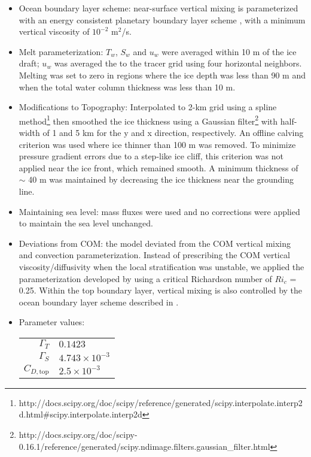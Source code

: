 \documentclass[11pt]{article} %
\begin{document}
\begin{itemize}
\item Ocean boundary layer scheme: near-surface vertical mixing is parameterized with an energy consistent planetary boundary layer scheme \citep{Reichl2018}, with a minimum vertical viscosity of $10^{-2}$ m$^2$/s.

\item Melt parameterization: $T_w$, $S_w$ and $u_w$ were averaged within 10 m of the ice draft; $u_w$ was averaged the to the tracer grid using four horizontal neighbors. Melting was set to zero in regions where the ice depth was less than 90 m and when the total water column thickness was less than 10 m.

\item Modifications to Topography: Interpolated to 2-km grid using a spline method\footnote{http://docs.scipy.org/doc/scipy/reference/generated/scipy.interpolate.interp2d.html\#scipy.interpolate.interp2d} then smoothed the ice thickness using a Gaussian filter\footnote{http://docs.scipy.org/doc/scipy-0.16.1/reference/generated/scipy.ndimage.filters.gaussian\_filter.html} with half-width of 1 and 5 km for the y and x direction, respectively. An offline calving criterion was used where ice thinner than 100 m was removed. To minimize pressure gradient errors due to a step-like ice cliff, this criterion was not applied near the ice front, which remained smooth. A minimum thickness of $\sim$ 40 m was maintained by decreasing the ice thickness near the grounding line.  

\item Maintaining sea level: mass fluxes were used and no corrections were applied to maintain the sea level unchanged.  

\item Deviations from COM: the model deviated from the COM vertical mixing and convection parameterization. Instead of prescribing the COM vertical viscosity/diffusivity when the local stratification was unstable, we applied the parameterization developed by \cite{Jackson2008} using a critical Richardson number of $Ri_c$ = 0.25. Within the top boundary layer, vertical mixing is also controlled by the ocean boundary layer scheme described in \cite{Reichl2018}.

\item Parameter values:

\begin{tabular}{rl}
$\Gamma_T$ & $0.1423$ \\
$\Gamma_S$ & $4.743 \times 10^{-3}$ \\
$C_{D,\textrm{top}}$ & $2.5 \times 10^{-3}$
\end{tabular}
\end{itemize}
\end{document}
